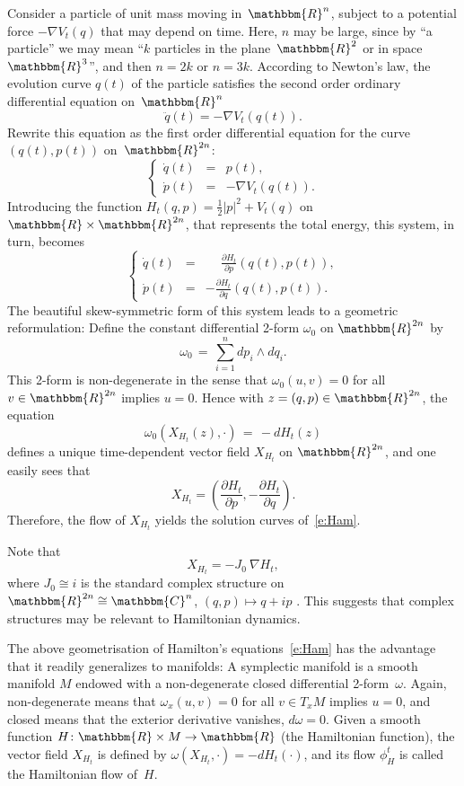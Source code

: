 \documentclass[12pt,twoside]{amsart}
\theoremstyle{plain}
\numberwithin{figure}{section}
\numberwithin{equation}{section}
\def\1{\:\!}
\def\go{\omega}
\def\CC{\mathbbm{C}}
\def\RR{\mathbbm{R}}
\def\pp{\partial}
\begin{document}
Consider a particle of unit mass moving in~$\RR^n$, 
subject to a potential force $-\nabla V_t(q)$ that may depend on time.
Here, $n$ may be large, since by ``a particle'' we may mean ``$k$ particles in the plane~$\RR^2$
or in space $\RR^3$'', and then $n=2k$ or $n=3k$.
According to Newton's law, the evolution curve $q(t)$ of the particle 
satisfies the second order ordinary differential equation on~$\RR^n$
\[
\ddot q(t) = -\nabla V_t(q(t)) .
\]
%
Rewrite this equation as the first order differential equation for the curve~$(q(t),p(t))$
on~$\RR^{2n}$:
%
\[
\left\{\begin{array} {lcl}
\dot q(t)      &= &   p(t), \\ [0.2em]
\dot p(t)      &= &   -\nabla V_t(q(t)) .
\end{array}\right.
\]
Introducing the function $H_t(q,p) = \frac 12 |p|^2 + V_t(q)$ on $\RR \times \RR^{2n}$,
that represents the total energy, 
this system, in turn, becomes
\begin{equation} \label{e:Ham}
\left\{\begin{array} {lcl}
\dot q(t)      &= &   \phantom{-} \displaystyle \frac{\pp H_t}{\pp p}(q(t), p(t)), \\ [1 em]
\dot p(t)      &= &   -           \displaystyle \frac{\pp H_t}{\pp q}(q(t), p(t)) .
\end{array}\right.
\end{equation}
%
The beautiful skew-symmetric form of this system leads to a geometric reformulation:
Define the constant differential 2-form $\go_0$ on $\RR^{2n}$ by
\[
\go_0 \,=\, \sum_{i=1}^n dp_i \wedge dq_i .
\]
This 2-form is non-degenerate in the sense that $\go_0(u,v) = 0$ for all $v \in \RR^{2n}$ implies $u=0$.
Hence with $z = (q,p) \in \RR^{2n}$, the equation
\[
\go_0(X_{H_t}(z), \cdot) \,=\, -dH_t (z)
\]
defines a unique time-dependent vector field $X_{H_t}$ on $\RR^{2n}$,
and one easily sees that 
\[
X_{H_t} = \left( \frac{\pp H_t}{\pp p} , - \frac{\pp H_t}{\pp q}\right).
\]
Therefore, the flow of $X_{H_t}$ yields the solution curves of~\eqref{e:Ham}.

Note that 
\[
X_{H_t} = -J_0 \1 \nabla H_t,
\] 
where $J_0 \cong i$ is the standard complex structure on $\RR^{2n} \cong \CC^n$, $(q,p) \mapsto q+ip$ .
This suggests that complex structures may be relevant to Hamiltonian dynamics.

The above geometrisation of Hamilton's equations~\eqref{e:Ham} has the advantage that it readily generalizes to manifolds:
A symplectic manifold is a smooth manifold $M$ endowed with a non-degenerate closed differential 2-form~$\go$.
Again, non-degenerate means that $\omega_x(u,v)=0$ for all $v \in T_xM$ implies $u=0$, and closed means
that the exterior derivative vanishes, $d \go =0$.
Given a smooth function $H \colon \RR \times M \to \RR$ (the Hamiltonian function), 
the vector field $X_{H_t}$ is defined by $\go (X_{H_t}, \cdot ) = -dH_t( \cdot )$,
and its flow $\phi_H^t$ is called the Hamiltonian flow of~$H$.
 
\end{document}

